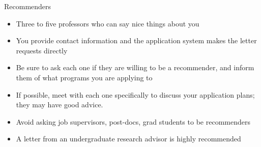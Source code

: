 \begin{frame}[fragile]{Recommenders}
    \begin{itemize}
        \item Three to five professors who can say nice things about you 
        \item You provide contact information and the application system makes the letter requests directly
        \item Be sure to ask each one if they are willing to be a recommender, and inform them of what programs you are applying to
        \item If possible, meet with each one specifically to discuss your application plans; they may have good advice.
        \item Avoid asking job supervisors, post-docs, grad students to be recommenders
        \item A letter from an undergraduate research advisor is highly recommended
    \end{itemize}
\end{frame}

